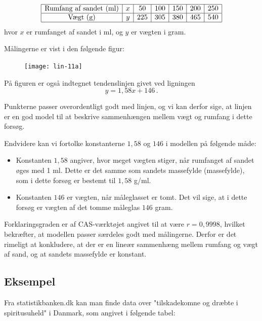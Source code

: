 \documentclass[12pt,oneside,a4paper]{article}
\begin{document}
\[
\begin{array}{|c|c|c|c|c|c|c|}
    \hline
    \mbox{Rumfang af sandet (ml)} & x &  50 &  100 &  150 &  200 &  250  \\
    \hline
    \mbox{Vægt (g)} & y &  225 &   305 &  380 &  465 &  540 \\
    \hline
\end{array}
\]
hvor $x$ er rumfanget af sandet i ml, og $y$ er vægten i gram.

Målingerne er vist i den følgende figur:

\begin{figure}[H]
    \centering
    \texttt{[image: lin-11a]}
    \caption{}
\end{figure}

På figuren er også indtegnet tendenslinjen givet ved ligningen
\[
    y=1,58 x + 146 \,.
\]

Punkterne passer overordentligt godt med linjen, og vi kan derfor sige, at linjen er en god model
til at beskrive sammenhængen mellem vægt og rumfang i dette forsøg.

Endvidere kan vi fortolke konstanterne $1,58$ og $146$ i modellen på følgende måde:
\begin{itemize}
    \item Konstanten $1,58$ angiver, hvor meget vægten stiger, når rumfanget af
        sandet øges med 1 ml. Dette er det samme som sandets massefylde 
        (massefylde), som i dette forsøg er bestemt til $1,58$ g/ml.
    \item Konstanten $146$ er vægten, når måleglasset er tomt. Det vil sige, at
        i dette forsøg er vægten af det tomme måleglas $146$ gram.
\end{itemize}

Forklaringsgraden er af CAS-værktøjet angivet til at være $r=0,9998$, hvilket bekræfter, at modellen
passer særdeles godt med målingerne. Derfor er det rimeligt at konkludere, at der er en 
lineær sammenhæng mellem rumfang og vægt af sand, og at sandets massefylde er konstant.

\subsection{Eksempel}
Fra statistikbanken.dk kan man finde data over "tilskadekomne og dræbte i spiritusuheld" i Danmark, som
angivet i følgende tabel:
\end{document}
